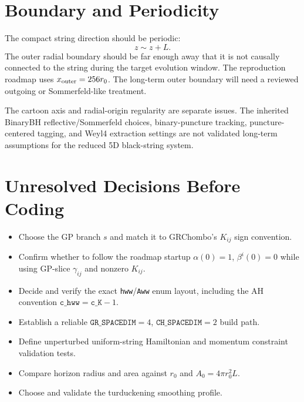 \documentclass[11pt]{article}
\newcommand{\GRSP}{\texttt{GR\_SPACEDIM}}
\newcommand{\CHSP}{\texttt{CH\_SPACEDIM}}
\begin{document}
\section{Boundary and Periodicity}

The compact string direction should be periodic:
\begin{equation}
  z \sim z + L .
\end{equation}
The outer radial boundary should be far enough away that it is not causally
connected to the string during the target evolution window. The reproduction
roadmap uses \(x_{\rm outer}=256 r_0\). The long-term outer boundary will need
a reviewed outgoing or Sommerfeld-like treatment.

The cartoon axis and radial-origin regularity are separate issues. The
inherited BinaryBH reflective/Sommerfeld choices, binary-puncture tracking,
puncture-centered tagging, and Weyl4 extraction settings are not validated
long-term assumptions for the reduced 5D black-string system.

\section{Unresolved Decisions Before Coding}

\begin{itemize}
  \item Choose the GP branch \(s\) and match it to GRChombo's \(K_{ij}\) sign
    convention.
  \item Confirm whether to follow the roadmap startup
    \(\alpha(0)=1\), \(\beta^i(0)=0\) while using GP-slice
    \(\gamma_{ij}\) and nonzero \(K_{ij}\).
  \item Decide and verify the exact \texttt{hww}/\texttt{Aww} enum layout,
    including the AH convention \(\texttt{c\_hww}=\texttt{c\_K}-1\).
  \item Establish a reliable \(\GRSP=4\), \(\CHSP=2\) build path.
  \item Define unperturbed uniform-string Hamiltonian and momentum constraint
    validation tests.
  \item Compare horizon radius and area against \(r_0\) and
    \(A_0 = 4\pi r_0^2 L\).
  \item Choose and validate the turduckening smoothing profile.
\end{itemize}
\end{document}
